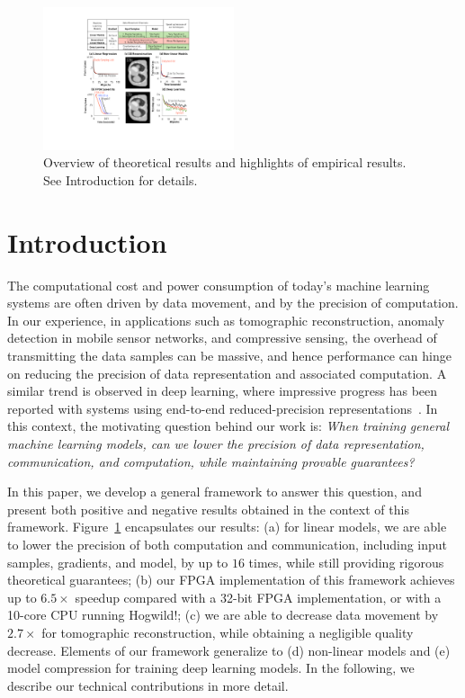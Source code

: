 \documentclass{article}
\begin{document}
\begin{figure}[t]
\centering
\includegraphics[width=0.5\textwidth]{Figures/RSHighlight}    
\vspace{-2em}
\caption{Overview of theoretical results and
highlights of empirical results. See
Introduction for details.}
\vspace{-1em}
\label{fig:highlight}
\end{figure}

\vspace{-3em}
\section{Introduction}

\vspace{-1em}
The computational cost and power consumption of today's machine learning systems are often driven by data movement, and by the precision of computation. 
In our experience, in applications such as tomographic reconstruction, anomaly detection in mobile sensor networks,
and compressive sensing, the overhead of transmitting the data samples can be massive, 
and hence performance can hinge on reducing the precision of data representation and 
associated computation. 
A similar trend is observed in deep learning, where impressive progress has been reported with systems 
using end-to-end reduced-precision representations~\cite{hubara2016quantized,
rastegari2016xnor,zhou2016dorefa,miyashita2016convolutional}. 
In this context, the motivating question behind our work is:  {\em When training general machine learning models,
can we lower the precision of data representation,
communication, and computation, while maintaining provable guarantees?}
 
In this paper, we develop a general 
framework to answer this question, and
present both positive and negative results
 obtained in the context of this framework. 
 Figure~\ref{fig:highlight} encapsulates our results: 
(a) for linear models, we are able to lower the precision of both computation and communication, including input samples, gradients, and model, by up to $16$ times, while still providing rigorous theoretical guarantees; 
(b) our FPGA implementation of this framework achieves up to $6.5\times$ speedup compared with
a 32-bit FPGA implementation, or with a 10-core CPU running Hogwild!;  
(c) we are able to decrease data movement by $2.7\times$ for
tomographic reconstruction, while obtaining a negligible quality decrease. 
Elements of our framework generalize to (d) non-linear models and (e) model compression for training deep learning models. 
In the following, we describe our technical contributions in more detail. 
\end{document}
